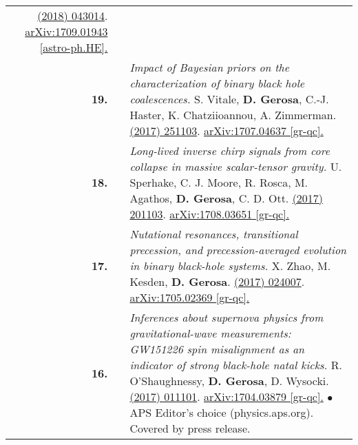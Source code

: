 {\begin{longtable}{rp{0.3cm}p{15.8cm}}
\newline{}
\href{https://journals.aps.org/prd/abstract/10.1103/PhysRevD.97.043014}{\prd 97 (2018) 043014}. \href{https://arxiv.org/abs/1709.01943}{arXiv:1709.01943 [astro-ph.HE].}
\vspace{0.09cm}\\
%
\textbf{19.} & & \textit{Impact of Bayesian priors on the characterization of binary black hole coalescences.}
\newline{}
S. Vitale, \textbf{D. Gerosa}, C.-J. Haster, K. Chatziioannou, A. Zimmerman.
\newline{}
\href{http://dx.doi.org/10.1103/PhysRevLett.119.251103}{\prl 119 (2017) 251103}. \href{https://arxiv.org/abs/1707.04637}{arXiv:1707.04637 [gr-qc].}
\vspace{0.09cm}\\
%
\textbf{18.} & & \textit{Long-lived inverse chirp signals from core collapse in massive scalar-tensor gravity.}
\newline{}
U. Sperhake, C. J. Moore, R. Rosca, M. Agathos, \textbf{D. Gerosa}, C. D. Ott.
\newline{}
\href{http://dx.doi.org/10.1103/PhysRevLett.119.201103}{\prl 119 (2017) 201103}. \href{https://arxiv.org/abs/1708.03651}{arXiv:1708.03651 [gr-qc].}
\vspace{0.09cm}\\
%
\textbf{17.} & & \textit{Nutational resonances, transitional precession, and precession-averaged evolution in binary black-hole systems.}
\newline{}
X. Zhao, M. Kesden, \textbf{D. Gerosa}.
\newline{}
\href{http://dx.doi.org/10.1103/PhysRevD.96.024007}{\prd 96 (2017) 024007}. \href{https://arxiv.org/abs/1705.02369}{arXiv:1705.02369 [gr-qc].}
\vspace{0.09cm}\\
%
\textbf{16.} & & \textit{Inferences about supernova physics from gravitational-wave measurements: GW151226 spin misalignment as an indicator of strong black-hole natal kicks.}
\newline{}
R. O'Shaughnessy, \textbf{D. Gerosa}, D. Wysocki.
\newline{}
\href{http://dx.doi.org/10.1103/PhysRevLett.119.011101}{\prl 119 (2017) 011101}. \href{https://arxiv.org/abs/1704.03879}{arXiv:1704.03879 [gr-qc].}
\newline{}
\textcolor{color1}{$\bullet$} APS Editor's choice (physics.aps.org). Covered by press release.
\vspace{0.09cm}\\

\end{longtable}}
